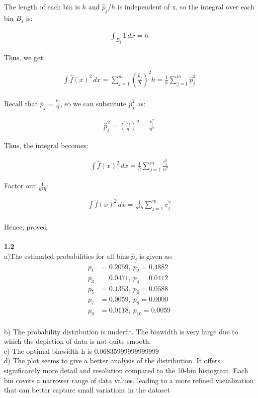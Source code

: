 The length of each bin is  $h$ and $ \hat{p}_{j}/h $ is independent of x, so the integral over each bin $B_j$  is:

\begin{align}
\int_{B_j} 1 \, dx = h
\end{align}

Thus, we get:

\begin{align}
\int \hat{f}(x)^2 \, dx = \sum_{j=1}^{m} \left( \frac{\hat{p}_j}{h} \right)^2 h = \frac{1}{h} \sum_{j=1}^{m} \hat{p}_j^2
\end{align}
\\

Recall that \( \hat{p}_j = \frac{v_j}{n} \), so we can substitute \( \hat{p}_j^2 \) as:

\begin{align}
\hat{p}_j^2 = \left( \frac{v_j}{n} \right)^2 = \frac{v_j^2}{n^2}
\end{align}

Thus, the integral becomes:

\begin{align}
\int \hat{f}(x)^2 \, dx = \frac{1}{h} \sum_{j=1}^{m} \frac{v_j^2}{n^2}
\end{align}

Factor out \( \frac{1}{n^2 h} \):

\begin{align}
\int \hat{f}(x)^2 \, dx = \frac{1}{n^2 h} \sum_{j=1}^{m} v_j^2
\end{align}
\\
Hence, proved.
\\
\\
\textbf{1.2}
\\
a)The estimated probabilities for all bins $\hat{p}_j$ is given as:
\begin{align*}
p_1 & = 0.2059, \:
p_2 = 0.4882 \\
p_3 & = 0.0471, \:
p_4 = 0.0412 \\
p_5 & = 0.1353, \:
p_6  = 0.0588 \\
p_7 & = 0.0059, \:
p_8 = 0.0000 \\
p_9 & = 0.0118, \:
p_{10} = 0.0059
\end{align*}
\\
b) The probability distribution is underfit. The binwidth is very large due to which the depiction of data is not quite smooth. \\
c) The optimal binwidth h is 0.06835999999999999
\\
d) The plot seems to give a better analysis of the distribution. It  offers significantly more detail and resolution compared to the 10-bin histogram. Each bin covers a narrower range of data values, leading to a more refined visualization that can better capture small variations in the dataset
